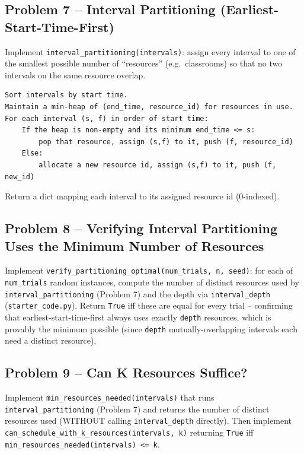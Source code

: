 \documentclass[11pt]{article}
\begin{document}
\subsection*{Problem 7 -- Interval Partitioning (Earliest-Start-Time-First)}

Implement \texttt{interval\_partitioning(intervals)}: assign every interval to one of the
smallest possible number of ``resources'' (e.g.\ classrooms) so that no two intervals on
the same resource overlap.
\begin{verbatim}
Sort intervals by start time.
Maintain a min-heap of (end_time, resource_id) for resources in use.
For each interval (s, f) in order of start time:
    If the heap is non-empty and its minimum end_time <= s:
        pop that resource, assign (s,f) to it, push (f, resource_id)
    Else:
        allocate a new resource id, assign (s,f) to it, push (f, new_id)
\end{verbatim}
Return a dict mapping each interval to its assigned resource id (0-indexed).

\subsection*{Problem 8 -- Verifying Interval Partitioning Uses the Minimum Number of Resources}

Implement \texttt{verify\_partitioning\_optimal(num\_trials, n, seed)}: for each of
\texttt{num\_trials} random instances, compute the number of distinct resources used by
\texttt{interval\_partitioning} (Problem 7) and the depth via \texttt{interval\_depth}
(\texttt{starter\_code.py}). Return \texttt{True} iff these are equal for every trial --
confirming that earliest-start-time-first always uses exactly \texttt{depth} resources,
which is provably the minimum possible (since \texttt{depth} mutually-overlapping
intervals each need a distinct resource).

\subsection*{Problem 9 -- Can K Resources Suffice?}

Implement \texttt{min\_resources\_needed(intervals)} that runs
\texttt{interval\_partitioning} (Problem 7) and returns the number of distinct resources
used (WITHOUT calling \texttt{interval\_depth} directly). Then implement
\texttt{can\_schedule\_with\_k\_resources(intervals, k)} returning \texttt{True} iff
\texttt{min\_resources\_needed(intervals) <= k}.
\end{document}
